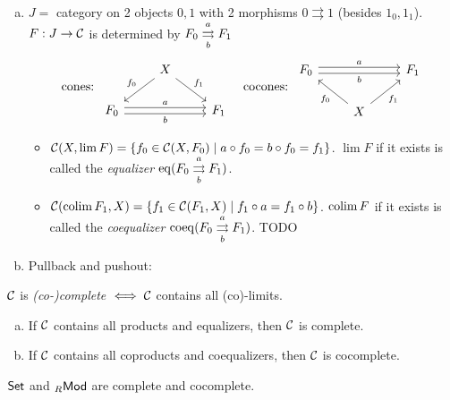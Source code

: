 \documentclass[a4paper]{report}
\begin{document}
\begin{exmps}
\begin{enumerate}[(a)]
\begin{itemize}
          \end{itemize}
    \item $J =$ category on 2 objects $0, 1$ with 2 morphisms $0 \rightrightarrows 1$ (besides $1_{0}, 1_{1}$). $F: J \to \mathcal{C}$ is determined by $F_{0} \overunderset ab \rightrightarrows F_{1}$
          \[\text{cones: }\begin{tikzcd}
                                                              & X \arrow[ld, "f_0"'] \arrow[rd, "f_1"] &     \\
F_0 \arrow[rr, "a", shift left] \arrow[rr, "b"', shift right] &                                        & F_1
\end{tikzcd} \quad \text{cocones: }\begin{tikzcd}
F_0 \arrow[rr, "a", shift left] \arrow[rr, "b"', shift right] &                                        & F_1 \\
                                                              & X \arrow[lu, "f_0"] \arrow[ru, "f_1"'] &
                                                            \end{tikzcd}\]
         \begin{itemize}
           \item $\mathcal{C}(X,\lim F) = \{f_0 \in \mathcal{C}(X, F_{0}) \mid a \circ f_{0} = b \circ f_{0} = f_{1}\}$. $\lim F$ if it exists is called the \emph{equalizer} $\eq(F_{0} \overunderset ab \rightrightarrows F_{1})$.
                 \item $\mathcal{C}(\operatorname*{colim} F_{1}, X) = \{f_{1} \in \mathcal{C}(F_{1}, X) \mid f_{1} \circ a = f_{1} \circ b\}$. $\operatorname*{colim} F$ if it exists is called the \emph{coequalizer} $\coeq(F_{0} \overunderset ab \rightrightarrows F_{1})$. TODO
         \end{itemize}
    \item Pullback and pushout:

  \end{enumerate}

        \end{exmps}
   \begin{defi}
$\mathcal{C}$ is \emph{(co-)complete} $\iff \mathcal{C}$ contains all (co)-limits.
\end{defi}
\begin{thm}
  \begin{enumerate}[(a)]
\item If $\mathcal{C}$ contains all products and equalizers, then $\mathcal{C}$ is complete.
\item If $\mathcal{C}$ contains all coproducts and coequalizers, then $\mathcal{C}$ is cocomplete.
  \end{enumerate}

\end{thm}
\begin{cor}
$\mathsf{Set}$ and ${}_R\mathsf{Mod}$ are complete and cocomplete.
\end{cor}
\end{document}
